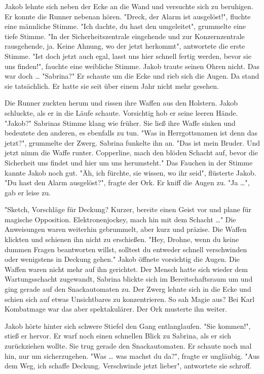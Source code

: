 \documentclass[a4paper, 10pt, twocolumn, twoside]{book}
\begin{document}
Jakob lehnte sich neben der Ecke an die Wand und versuchte sich zu beruhigen. Er konnte die Runner nebenan hören.
"Dreck, der Alarm ist ausgelöst!", fluchte eine männliche Stimme.
"Ich dachte, du hast den umgeleitet", grummelte eine tiefe Stimme.
"In der Sicherheitszentrale eingehende und zur Konzernzentrale rausgehende, ja. Keine Ahnung, wo der jetzt herkommt", antwortete die erste Stimme.
"Ist doch jetzt auch egal, lasst uns hier schnell fertig werden, bevor sie uns finden!", fauchte eine weibliche Stimme.
Jakob traute seinen Ohren nicht. Das war doch …
"Sabrina?" Er schaute um die Ecke und rieb sich die Augen.
Da stand sie tatsächlich. Er hatte sie seit über einem Jahr nicht mehr gesehen.

Die Runner zuckten herum und rissen ihre Waffen aus den Holstern. Jakob schluckte, als er in die Läufe schaute. Vorsichtig hob er seine leeren Hände.
"Jakob?" Sabrinas Stimme klang wie früher. Sie ließ ihre Waffe sinken und bedeutete den anderen, es ebenfalls zu tun.
"Was in Herrgottsnamen ist denn das jetzt?", grummelte der Zwerg.
Sabrina funkelte ihn an. "Das ist mein Bruder. Und jetzt nimm die Waffe runter. Copperline, mach den blöden Schacht auf, bevor die Sicherheit uns findet und hier um uns herumsteht." Das Fauchen in der Stimme kannte Jakob noch gut.
"Äh, ich fürchte, sie wissen, wo ihr seid", flüsterte Jakob.
"Du hast den Alarm ausgelöst?", fragte der Ork.
Er kniff die Augen zu. "Ja …", gab er leise zu.

"Sketch, Vorschläge für Deckung? Kurzer, bereite einen Geist vor und plane für magische Opposition. Elektronenjockey, mach hin mit dem Schacht …"
Die Anweisungen waren weiterhin gebrummelt, aber kurz und präzise. Die Waffen klickten und schienen ihn nicht zu erschießen.
"Hey, Drohne, wenn du keine dummen Fragen beantworten willst, solltest du entweder schnell verschwinden oder wenigstens in Deckung gehen."
Jakob öffnete vorsichtig die Augen. Die Waffen waren nicht mehr auf ihn gerichtet. Der Mensch hatte sich wieder dem Wartungsschacht zugewandt, Sabrina blickte sich im Bereitschaftsraum um und ging gerade auf den Snackautomaten zu.
Der Zwerg lehnte sich in die Ecke und schien sich auf etwas Unsichtbares zu konzentrieren. So sah Magie aus? Bei Karl Kombatmage war das aber spektakulärer. Der Ork musterte ihn weiter.

Jakob hörte hinter sich schwere Stiefel den Gang entlanglaufen.
"Sie kommen!", stieß er hervor. Er warf noch einen schnellen Blick zu Sabrina, als er sich zurückziehen wollte. Sie trug gerade den Snackautomaten. Er schaute noch mal hin, nur um sicherzugehen.
"Was … was machst du da?", fragte er ungläubig.
"Aus dem Weg, ich schaffe Deckung. Verschwinde jetzt lieber", antwortete sie schroff.
\end{document}
